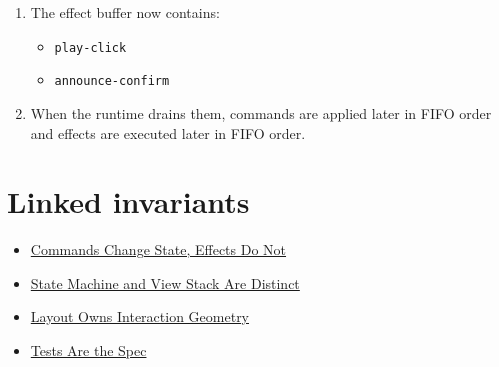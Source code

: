 \begin{enumerate}
  \begin{itemize}
  \tightlist
  \item
    \texttt{o\allowbreak{}p\allowbreak{}e\allowbreak{}n\allowbreak{}-\allowbreak{}m\allowbreak{}o\allowbreak{}d\allowbreak{}a\allowbreak{}l}
  \item
    \texttt{f\allowbreak{}o\allowbreak{}c\allowbreak{}u\allowbreak{}s\allowbreak{}-\allowbreak{}c\allowbreak{}o\allowbreak{}n\allowbreak{}f\allowbreak{}i\allowbreak{}r\allowbreak{}m}
  \item
    \texttt{t\allowbreak{}r\allowbreak{}a\allowbreak{}c\allowbreak{}k\allowbreak{}-\allowbreak{}s\allowbreak{}e\allowbreak{}l\allowbreak{}e\allowbreak{}c\allowbreak{}t\allowbreak{}i\allowbreak{}o\allowbreak{}n}
  \end{itemize}
\item
  The effect buffer now contains:

  \begin{itemize}
  \tightlist
  \item
    \texttt{p\allowbreak{}l\allowbreak{}a\allowbreak{}y\allowbreak{}-\allowbreak{}c\allowbreak{}l\allowbreak{}i\allowbreak{}c\allowbreak{}k}
  \item
    \texttt{a\allowbreak{}n\allowbreak{}n\allowbreak{}o\allowbreak{}u\allowbreak{}n\allowbreak{}c\allowbreak{}e\allowbreak{}-\allowbreak{}c\allowbreak{}o\allowbreak{}n\allowbreak{}f\allowbreak{}i\allowbreak{}r\allowbreak{}m}
  \end{itemize}
\item
  When the runtime drains them, commands are applied later in FIFO order and effects are executed later in FIFO order.
\end{enumerate}

\section{Linked invariants}\label{record-153-linked-invariants}

\begin{itemize}
\tightlist
\item
  \href{https://github.com/flyingrobots/bijou/blob/cbd70612140e7a450d764b3c7be1c6af878b99bc/docs/invariants/commands-change-state-effects-do-not.md}{Commands Change State, Effects Do Not}
\item
  \href{https://github.com/flyingrobots/bijou/blob/cbd70612140e7a450d764b3c7be1c6af878b99bc/docs/invariants/state-machine-and-view-stack-are-distinct.md}{State Machine and View Stack Are Distinct}
\item
  \href{https://github.com/flyingrobots/bijou/blob/cbd70612140e7a450d764b3c7be1c6af878b99bc/docs/invariants/layout-owns-interaction-geometry.md}{Layout Owns Interaction Geometry}
\item
  \href{https://github.com/flyingrobots/bijou/blob/cbd70612140e7a450d764b3c7be1c6af878b99bc/docs/invariants/tests-are-the-spec.md}{Tests Are the Spec}
\end{itemize}

